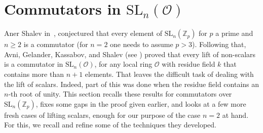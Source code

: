\documentclass[10pt,twoside]{amsart}
\newcommand{\SL}{\mathrm{SL}}
\theoremstyle{definition}
\theoremstyle{definition}
\begin{document}
\section{Commutators in $\SL_n(\mathcal O)$}{\label{towards Shalev's conj}}

Aner Shalev in~\cite{Shalevzeta}, conjectured that every element of $\mathrm{SL}_n(\mathbb{Z}_p)$ for $p$ a prime and $n\geq 2$ is a commutator (for $n=2$ one needs to assume $p>3$). Following that, Avni, Gelander, Kassabov, and Shalev (see \cite{AvniGelanderKassabovShalev}) proved that every lift of non-scalars is a commutator in $\mathrm{SL}_n(\mathcal{O})$, for any local ring $\mathcal{O}$ with residue field $k$ that contains more than $n+1$ elements. That leaves the difficult task of dealing with the lift of scalars. Indeed, part of this was done when the residue field contains an $n$-th root of unity. This section recalls these results for commutators over $\SL_n(\mathbb{Z}_p)$, fixes some gaps in the proof given earlier, and looks at a few more fresh cases of lifting scalars, enough for our purpose of the case $n=2$ at hand. For this, we recall and refine some of the techniques they developed.  
\end{document}
